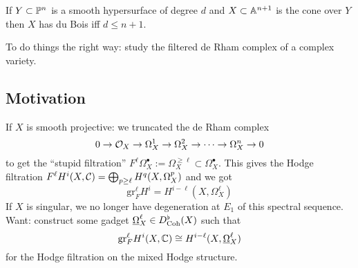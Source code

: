 \documentclass[12pt]{article}
\renewcommand{\gr}{\mathrm{gr}}
\begin{document}
\begin{exercise}
If $Y \subset \P^n$ is a smooth hypersurface of degree $d$ and $X \subset \A^{n+1}$ is the cone over $Y$ then $X$ has du Bois iff $d \le n + 1$. 
\end{exercise}

To do things the right way: study the filtered de Rham complex of a complex variety. 

\subsection{Motivation}

If $X$ is smooth projective: we truncated the de Rham complex
\[ 0 \to \struct{X} \to \Omega_X^1 \to \Omega_X^2 \to \cdots \to \Omega_X^n \to 0 \]
to get the ``stupid filtration'' $F^\ell \Omega_X^\bullet := \Omega^{\ge \ell}_X \subset \Omega^\bullet_X$. This gives the Hodge filtration $F^\ell H^i(X, \C) = \bigoplus_{p \ge \ell} H^q(X, \Omega_X^p)$ and we got
\[ \gr_F^\ell H^i = H^{i - \ell}(X, \Omega_X^\ell) \]
If $X$ is singular, we no longer have degeneration at $E_1$ of this spectral sequence. 
\bigskip\\
Want: construct some gadget $\ul{\Omega}_X^\ell \in D^\flat_{\mathrm{Coh}}(X)$ such that
\[ \gr_F^\ell H^i(X, \CC) \cong H^{i - \ell}(X, \ul{\Omega}_X^\ell) \]
for the Hodge filtration on the mixed Hodge structure. 
\end{document}
